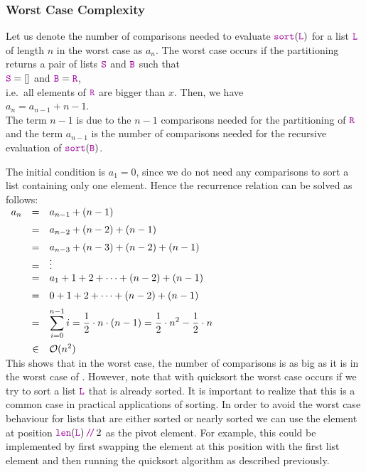 \subsubsection{Worst Case Complexity}
Let us denote the number of comparisons needed to evaluate $\mytt{sort}(\mytt{L})$ for a list $\mytt{L}$ of
length $n$ in the worst case as $a_n$.  The worst case occurs if the partitioning
returns a pair of lists $\mytt{S}$ and $\mytt{B}$ such that
\\[0.2cm]
\hspace*{1.3cm}
$\mytt{S} = []$ \quad and \quad $\mytt{B} = \mytt{R}$,
\\[0.2cm]
i.e.~all elements of $\mytt{R}$ are bigger than $x$.  Then, we have
\\[0.2cm]
\hspace*{1.3cm}
$a_n = a_{n-1} + n - 1$. 
\\[0.2cm]
The term $n-1$ is due to the $n-1$ comparisons needed for the partitioning of $\mytt{R}$
and the term $a_{n-1}$ is the number of comparisons needed for the recursive evaluation of $\mytt{sort}(\mytt{B})$.

The initial condition is $a_1 = 0$, since we do not need any comparisons to sort a list
containing only one element.
Hence the recurrence relation can be solved as follows:
\\[0.2cm]
\hspace*{1.3cm}
$
\begin{array}{lcl}
  a_n & = & a_{n-1} + (n-1) \\[0.2cm]
      & = & a_{n-2} + (n-2) + (n-1) \\[0.2cm]
      & = & a_{n-3} + (n-3) + (n-2) + (n-1) \\
      & = & \vdots \\
      & = & a_{1} + 1 + 2 + \cdots  + (n-2) + (n-1) \\[0.2cm]
      & = & 0 + 1 + 2 + \cdots  + (n-2) + (n-1) \\[0.2cm]
      & = & \displaystyle \sum\limits_{i=0}^{n-1} i  =  \frac{1}{2} \cdot n \cdot(n - 1) =
            \frac{1}{2} \cdot n^2 - \frac{1}{2} \cdot n \\[0.5cm]
      & \in & \mathcal{O}(n^2)
\end{array}
$
\\[0.2cm]
This shows that in the worst case, the number of comparisons is as big as it is in the worst case of 
.  However, note that with quicksort the worst case occurs if we try to sort a list
$\mytt{L}$ that is already sorted.  It is important to realize that this is a common case in practical
applications of sorting.  In order to avoid the worst case behaviour for lists that are either sorted or nearly
sorted we can use the element at position $\mytt{len}(\mytt{L})\dv 2$ as the pivot element.  For example, this
could be implemented by first swapping the element at this position with the first list element and then
running the quicksort algorithm as described previously.


